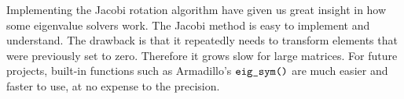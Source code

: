 Implementing the Jacobi rotation algorithm have given us great insight in how some
eigenvalue solvers work. The Jacobi method is easy to implement and understand. The
drawback is that it repeatedly needs to transform elements that were previously set to
zero. Therefore it grows slow for large matrices. For future projects, built-in functions
such as Armadillo's $\verb|eig_sym()|$ are much easier and faster to use, at no expense to 
the precision.
